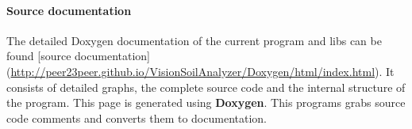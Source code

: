 \paragraph{Source documentation}
The detailed Doxygen documentation of the current program and libs can be found [source documentation](\url{http://peer23peer.github.io/VisionSoilAnalyzer/Doxygen/html/index.html}). It consists of detailed graphs, the complete source code and the internal structure of the program. This page is generated using \textbf{Doxygen}. This programs grabs source code comments and converts them to documentation. 
